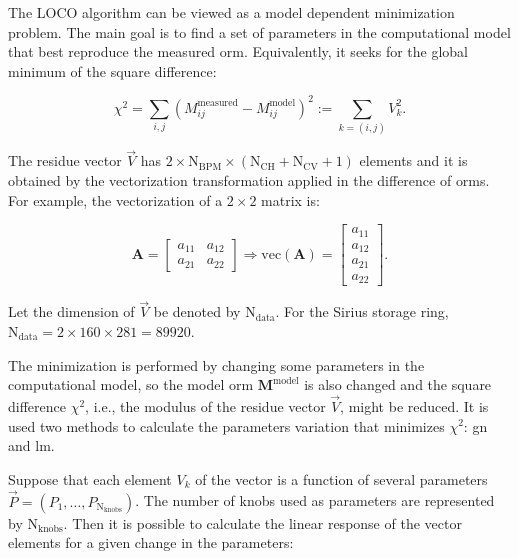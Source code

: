 The LOCO algorithm can be viewed as a model dependent minimization problem. The main goal is to find a set of parameters in the computational model that best reproduce the measured \gls{orm}. Equivalently, it seeks for the global minimum of the square difference:

\begin{equation}
    \chi^2 = \sum_{i, j} \left(M^{\mathrm{measured}}_{ij} - M^{\mathrm{model}}_{ij}\right)^2 := \sum_{{k = (i,j)}} V_{k}^2.
    \label{eq:chi2}
\end{equation}

The residue vector $\vec{V}$ has $2 \times \mathrm{N}_{\mathrm{BPM}} \times \left(\mathrm{N}_{\mathrm{CH}} + \mathrm{N}_{\mathrm{CV}}+1\right)$ elements and it is obtained by the vectorization transformation applied in the difference of \gls{orm}s. For example, the vectorization of a $2 \times 2$ matrix is:

\begin{equation}
        \mathbf{A} = \begin{bmatrix}
     a_{11} & a_{12} \\
     a_{21} & a_{22} 
\end{bmatrix} \Rightarrow \mathrm{vec}\left(\mathbf{A}\right) = \begin{bmatrix}
     a_{11}  \\
     a_{12} \\
     a_{21} \\ 
     a_{22} 
\end{bmatrix}.
\end{equation}

Let the dimension of $\vec{V}$ be denoted by $\mathrm{N}_{\mathrm{data}}$. For the Sirius storage ring, $\mathrm{N}_{\mathrm{data}} = 2 \times 160 \times 281 = 89920$.

The minimization is performed by changing some parameters in the computational model, so the model \gls{orm} $\mathbf{M}^{\mathrm{model}}$ is also changed and the square difference $\chi^2$, i.e., the modulus of the residue vector $\vec{V}$, might be reduced. It is used two methods to calculate the parameters variation that minimizes $\chi^2$: \gls{gn} and \gls{lm}.

Suppose that each element $V_k$ of the vector is a function of several parameters $\vec{P} = \left(P_1, \ldots, P_{\mathrm{N}_{\mathrm{knobs}}}\right)$. The number of knobs used as parameters are represented by $\mathrm{N}_{\mathrm{knobs}}$. Then it is possible to calculate the linear response of the vector elements for a given change in the parameters:

